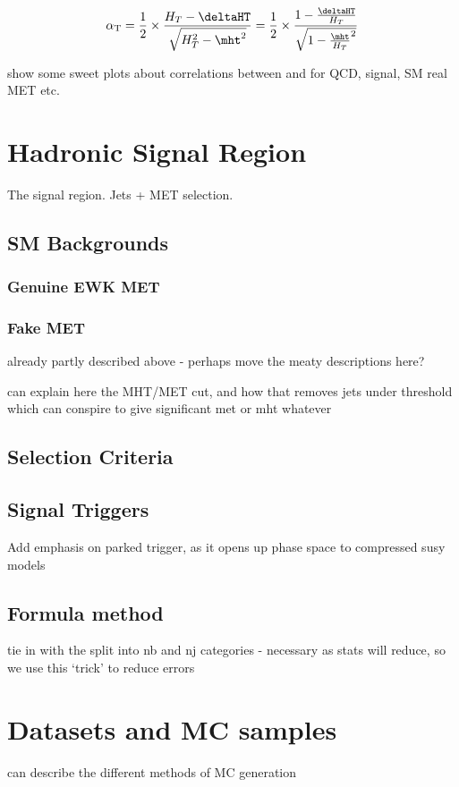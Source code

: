 \begin{equation}
\alphat = \frac{1}{2} \times \frac{\HT-\deltaHT}{\sqrt{\HT^2 - \mht^2}} = 
\frac{1}{2} \times \frac{1-\frac{\deltaHT}{\HT}}{\sqrt{1 - \frac{\mht}{\HT}^2}}
\label{eq:alphat_njet}
\end{equation}

show some sweet plots about correlations between \mht and \deltaHT for QCD, 
signal, SM real MET etc.


\section{Hadronic Signal Region}
\label{sec:selection_hadronic}
The signal region. Jets + MET selection.

\subsection{SM Backgrounds}
\subsubsection{Genuine EWK MET}
\subsubsection{Fake MET}
already partly described above - perhaps move the meaty descriptions here?

can explain here the MHT/MET cut, and how that removes jets under threshold 
which can conspire to give significant met or mht whatever

\subsection{Selection Criteria}

\subsection{Signal Triggers}

Add emphasis on parked trigger, as it opens up phase space to compressed susy models

\subsection{Formula method}

tie in with the split into nb and nj categories - necessary as stats will reduce, so we use
this `trick' to reduce errors



\section{Datasets and MC samples}

can describe the different methods of MC generation